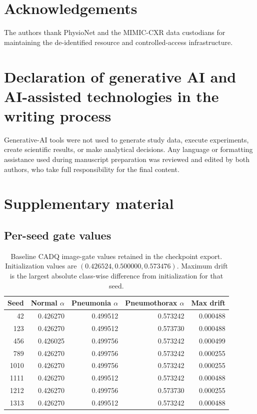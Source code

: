 \documentclass[a4paper,fleqn]{cas-sc}
\begin{document}
\section*{Acknowledgements}
The authors thank PhysioNet and the MIMIC-CXR data custodians for maintaining
the de-identified resource and controlled-access infrastructure.

\section*{Declaration of generative AI and AI-assisted technologies in the writing process}
Generative-AI tools were not used to generate study data, execute experiments,
create scientific results, or make analytical decisions. Any language or
formatting assistance used during manuscript preparation was reviewed and
edited by both authors, who take full responsibility for the final content.

\clearpage
\appendix
\setcounter{table}{0}
\setcounter{figure}{0}
\renewcommand{\thesection}{S}
\renewcommand{\thetable}{S\arabic{table}}
\renewcommand{\thefigure}{S\arabic{figure}}
\section{Supplementary material}

\subsection{Per-seed gate values}

\begin{table}[pos=H]
\centering
\caption{Baseline CADQ image-gate values retained in the checkpoint export.
Initialization values are $(0.426524,0.500000,0.573476)$. Maximum drift is the
largest absolute class-wise difference from initialization for that seed.}
\label{tab:s-gates}
\scriptsize
\begin{tabular}{r rrr r}
\toprule
Seed & Normal $\alpha$ & Pneumonia $\alpha$ & Pneumothorax $\alpha$ & Max drift \\
\midrule
42   & 0.426270 & 0.499512 & 0.573242 & 0.000488 \\
123  & 0.426270 & 0.499512 & 0.573730 & 0.000488 \\
456  & 0.426025 & 0.499756 & 0.573242 & 0.000499 \\
789  & 0.426270 & 0.499756 & 0.573242 & 0.000255 \\
1010 & 0.426270 & 0.499756 & 0.573242 & 0.000255 \\
1111 & 0.426270 & 0.499512 & 0.573242 & 0.000488 \\
1212 & 0.426270 & 0.499756 & 0.573730 & 0.000255 \\
1313 & 0.426270 & 0.499512 & 0.573242 & 0.000488 \\
\bottomrule
\end{tabular}
\end{table}
\end{document}
